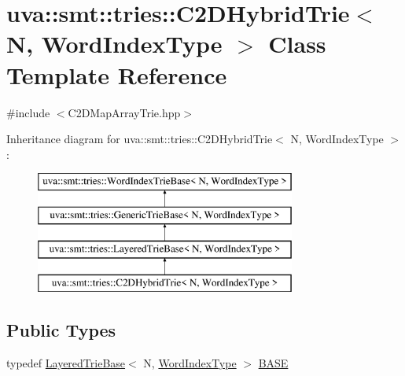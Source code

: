 \hypertarget{classuva_1_1smt_1_1tries_1_1_c2_d_hybrid_trie}{}\section{uva\+:\+:smt\+:\+:tries\+:\+:C2\+D\+Hybrid\+Trie$<$ N, Word\+Index\+Type $>$ Class Template Reference}
\label{classuva_1_1smt_1_1tries_1_1_c2_d_hybrid_trie}


{\ttfamily \#include $<$C2\+D\+Map\+Array\+Trie.\+hpp$>$}

Inheritance diagram for uva\+:\+:smt\+:\+:tries\+:\+:C2\+D\+Hybrid\+Trie$<$ N, Word\+Index\+Type $>$\+:\begin{figure}[H]
\begin{center}
\leavevmode
\includegraphics[height=4.000000cm]{classuva_1_1smt_1_1tries_1_1_c2_d_hybrid_trie}
\end{center}
\end{figure}
\subsection*{Public Types}
\begin{DoxyCompactItemize}
\item 
typedef \hyperlink{classuva_1_1smt_1_1tries_1_1_layered_trie_base}{Layered\+Trie\+Base}$<$ N, \hyperlink{classuva_1_1smt_1_1tries_1_1_word_index_trie_base_a30c4fffe3a3423c87b229b66340dd2f8}{Word\+Index\+Type} $>$ \hyperlink{classuva_1_1smt_1_1tries_1_1_c2_d_hybrid_trie_a33ce4730ea0896a4ea7995c9e80688f7}{B\+A\+S\+E}
\end{DoxyCompactItemize}
